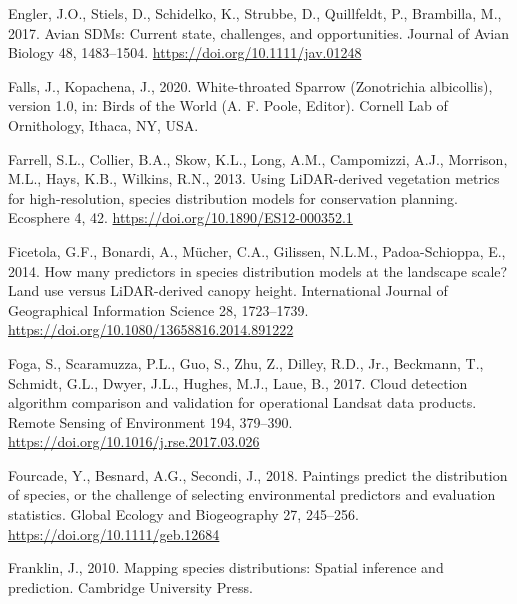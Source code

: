\documentclass[
]{article}
\newlength{\cslhangindent}
\newlength{\cslentryspacingunit} %
\newenvironment{CSLReferences}[2] %
 {%
  \setlength{\parindent}{0pt}
  \ifodd #1
  \let\oldpar\par
  \def\par{\hangindent=\cslhangindent\oldpar}
  \fi
  \setlength{\parskip}{#2\cslentryspacingunit}
 }%
 {}
\begin{document}
\begin{CSLReferences}{1}{0}
\leavevmode{}%
Engler, J.O., Stiels, D., Schidelko, K., Strubbe, D., Quillfeldt, P., Brambilla, M., 2017. Avian {SDMs}: Current state, challenges, and opportunities. Journal of Avian Biology 48, 1483--1504. \url{https://doi.org/10.1111/jav.01248}

\leavevmode{}%
Falls, J., Kopachena, J., 2020. White-throated {Sparrow} ({Zonotrichia} albicollis), version 1.0, in: Birds of the {World} ({A}. {F}. {Poole}, {Editor}). Cornell Lab of Ornithology, Ithaca, NY, USA.

\leavevmode{}%
Farrell, S.L., Collier, B.A., Skow, K.L., Long, A.M., Campomizzi, A.J., Morrison, M.L., Hays, K.B., Wilkins, R.N., 2013. Using {LiDAR}-derived vegetation metrics for high-resolution, species distribution models for conservation planning. Ecosphere 4, 42. \url{https://doi.org/10.1890/ES12-000352.1}

\leavevmode{}%
Ficetola, G.F., Bonardi, A., Mücher, C.A., Gilissen, N.L.M., Padoa-Schioppa, E., 2014. How many predictors in species distribution models at the landscape scale? {Land} use versus {LiDAR}-derived canopy height. International Journal of Geographical Information Science 28, 1723--1739. \url{https://doi.org/10.1080/13658816.2014.891222}

\leavevmode{}%
Foga, S., Scaramuzza, P.L., Guo, S., Zhu, Z., Dilley, R.D., Jr., Beckmann, T., Schmidt, G.L., Dwyer, J.L., Hughes, M.J., Laue, B., 2017. Cloud detection algorithm comparison and validation for operational {Landsat} data products. Remote Sensing of Environment 194, 379--390. \url{https://doi.org/10.1016/j.rse.2017.03.026}

\leavevmode{}%
Fourcade, Y., Besnard, A.G., Secondi, J., 2018. Paintings predict the distribution of species, or the challenge of selecting environmental predictors and evaluation statistics. Global Ecology and Biogeography 27, 245--256. \url{https://doi.org/10.1111/geb.12684}

\leavevmode{}%
Franklin, J., 2010. Mapping species distributions: Spatial inference and prediction. Cambridge University Press.


\end{CSLReferences}
\end{document}
